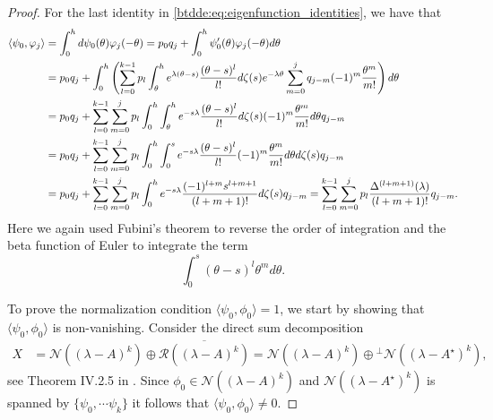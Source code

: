 \begin{proof}
For the last identity in \cref{btdde:eq:eigenfunction_identities}, we have that
\begin{align*}
    \left< \psi_0, \phi_j \right> 
    &= \int_0^h d\psi_0(\theta) \phi_j(-\theta) 
         = p_0q_j + \int_0^h \psi'_0(\theta) \phi_j(-\theta) d\theta \\
    &= p_0 q_j + \int_0^h \left( \sum_{l=0}^{k-1} p_l 
        \int_\theta^h e^{\lambda(\theta-s)}\frac{(\theta-s)^l}{l!} d\zeta(s)  
        e^{-\lambda\theta} \sum_{m=0}^j q_{j-m} (-1)^m\frac{\theta^m}{m!} \right) d\theta \\
    &= p_0 q_j + \sum_{l=0}^{k-1} \sum_{m=0}^j p_l \int_0^h  
        \int_\theta^h e^{-s\lambda}\frac{(\theta-s)^l}{l!} d\zeta(s)  
        (-1)^m\frac{\theta^m}{m!} d\theta q_{j-m}   \\
    &= p_0 q_j + \sum_{l=0}^{k-1} \sum_{m=0}^j p_l \int_0^h  
        \int_0^s e^{-s\lambda}\frac{(\theta-s)^l}{l!}   
        (-1)^m\frac{\theta^m}{m!} d\theta d\zeta(s) q_{j-m} \\
    &= p_0 q_j + \sum_{l=0}^{k-1} \sum_{m=0}^j p_l \int_0^h  
    e^{-s\lambda} \frac{(-1)^{l + m} s^{l + m+1}}{(l + m+1)!} d\zeta(s) q_{j-m}
    \process{%
        \\ &
    }
    = \sum_{l=0}^{k-1} \sum_{m=0}^j p_l \frac{\Delta^{(l + m+1)}(\lambda)}{(l + m+1)!} q_{j-m}.
\end{align*}
Here we again used Fubini's theorem to reverse the order of integration and the beta function of Euler to integrate the term
\[
\int_0^s (\theta-s)^l\theta^m d\theta.
\]

To prove the normalization condition $\langle\psi_0,\phi_0\rangle = 1$,
we start by showing that $\langle\psi_0,\phi_0\rangle$
is non-vanishing. Consider the direct sum decomposition 
\begin{align*}
X & = \mathcal{N}((\lambda-A)^k)\oplus\overline{\mathcal{R}((\lambda-A)^k)}
    = \mathcal{N}((\lambda-A)^k)\oplus{}^{\bot}\mathcal{N}((\lambda-A^{\star})^k),
\end{align*}
see Theorem IV.2.5 in \cite{diekmann1995delay}. Since $\phi_0\in\mathcal{N}((\lambda-A)^k)$
and $\mathcal{N}((\lambda-A^{\star})^k)$ is spanned by $\{\psi_0, \cdots \psi_k\}$
it follows that $\langle\psi_0,\phi_0\rangle\neq0$.


\end{proof}
